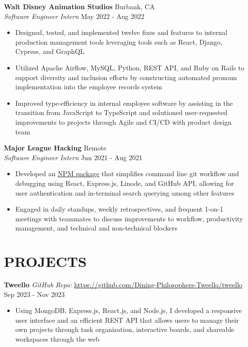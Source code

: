 \documentclass[a4paper,10pt]{extarticle}
\begin{document}
\noindent
\textbf{Walt Disney Animation Studios} \hfill Burbank, CA \\ %
\textit{Software Engineer Intern} \hfill May 2022 - Aug 2022 %
\begin{itemize}
    \item Designed, tested, and implemented twelve fixes and features to internal production management tools leveraging tools such as React, Django, Cypress, and GraphQL
    \item Utilized Apache Airflow, MySQL, Python, REST API, and Ruby on Rails to support diversity and inclusion efforts by constructing automated pronoun implementation into the employee records system
    \item Improved type-efficiency in internal employee software by assisting in the transition from JavaScript to TypeScript and solutioned user-requested improvements to projects through Agile and CI/CD with product design team %
\end{itemize}

\noindent
\textbf{Major League Hacking} \hfill Remote\\ %
\textit{Software Engineer Intern} \hfill Jun 2021 - Aug 2021 %
\begin{itemize}
    \item Developed an \href{https://devpost.com/software/central-cli}{NPM package} that simplifies command line git workflow and debugging using React, Express.js, Linode, and GitHub API, allowing for user authentication and in-terminal search querying among other features
    \item Engaged in daily standups, weekly retrospectives, and frequent 1-on-1 meetings with teammates to discuss improvements to workflow, productivity management, and technical and non-technical blockers %
\end{itemize}


\section*{PROJECTS}
\noindent
\textbf{Tweello} %
\textit{GitHub Repo:} \url{https://github.com/Dining-Philosophers-Tweello/tweello} \hfill Sep 2023 - Nov 2023 %
\begin{itemize}
    \item Using MongoDB, Express.js, React.js, and Node.js, I developed a responsive user interface and an efficient REST API that allows users to manage their own projects through task organization, interactive boards, and shareable workspaces through the web %
  \end{itemize}
\end{document}
